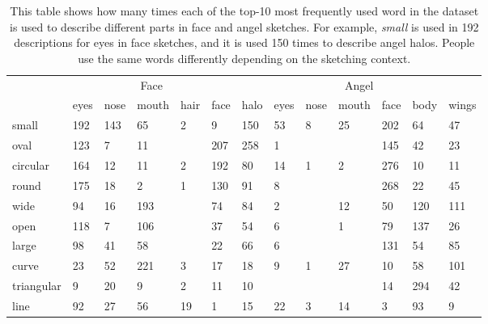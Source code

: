 

\begin{table}[!htb]
\begin{minipage}{1\textwidth}
\begin{center}
{\small
\begin{tabular}{p{5em} | p{1.5em}p{1.5em}p{2em}p{1.5em}p{1.5em} | p{1.5em}p{1.5em}p{1.5em}p{2em}p{1.5em}p{1.5em}p{1.5em} }
\toprule
~ & \multicolumn{5}{c}{Face} & \multicolumn{7}{c}{Angel}\\
~ & eyes & nose & mouth & hair & face & halo & eyes & nose & mouth & face & body & wings  \\
\midrule
small & 192 & 143 & 65 & 2 & 9 & 150 & 53 & 8 & 25 & 202 & 64 & 47 \\
oval & 123 & 7 & 11 &   & 207 & 258 & 1 &   &   & 145 & 42 & 23 \\
circular & 164 & 12 & 11 & 2 & 192 & 80 & 14 & 1 & 2 & 276 & 10 & 11 \\
round & 175 & 18 & 2 & 1 & 130 & 91 & 8 &   &   & 268 & 22 & 45 \\
wide & 94 & 16 & 193 &   & 74 & 84 & 2 &   & 12 & 50 & 120 & 111 \\
open & 118 & 7 & 106 &   & 37 & 54 & 6 &   & 1 & 79 & 137 & 26 \\
large & 98 & 41 & 58 &   & 22 & 66 & 6 &   &   & 131 & 54 & 85 \\
curve & 23 & 52 & 221 & 3 & 17 & 18 & 9 & 1 & 27 & 10 & 58 & 101 \\
triangular & 9 & 20 & 9 & 2 & 11 & 10 &   &   &   & 14 & 294 & 42 \\
line & 92 & 27 & 56 & 19 & 1 & 15 & 22 & 3 & 14 & 3 & 93 & 9\\
\bottomrule
\end{tabular}}
\caption{This table shows how many times each of the top-10 most frequently used word in the dataset is used to describe different parts in face and angel sketches. For example, \textit{small} is used in 192 descriptions for eyes in face sketches, and it is used 150 times to describe angel halos. People use the same words differently depending on the sketching context.}
\label{table:parts_share_description}
\end{center}
\end{minipage}
\end{table}

